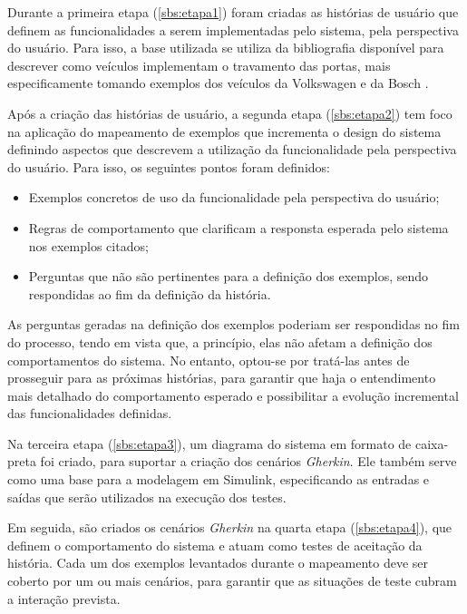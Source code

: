 Durante a primeira etapa (\ref{sbs:etapa1}) foram criadas as histórias de usuário que definem as funcionalidades a serem implementadas pelo sistema, 
pela perspectiva do usuário. Para isso, a base utilizada se utiliza da bibliografia disponível para descrever como veículos implementam o travamento das portas, 
mais especificamente tomando exemplos dos veículos da Volkswagen \cite{vwLocking} e da Bosch \cite{bosch2022handbook,reif2017locking}.

Após a criação das histórias de usuário, a segunda etapa (\ref{sbs:etapa2}) tem foco na aplicação do mapeamento de exemplos que incrementa o design do sistema definindo aspectos 
que descrevem a utilização da funcionalidade pela perspectiva do usuário. Para isso, os seguintes pontos foram definidos:

\begin{itemize}
    \item Exemplos concretos de uso da funcionalidade pela perspectiva do usuário;
    \item Regras de comportamento que clarificam a responsta esperada pelo sistema nos exemplos citados;
    \item Perguntas que não são pertinentes para a definição dos exemplos, sendo respondidas ao fim da definição da história.
\end{itemize}

As perguntas geradas na definição dos exemplos poderiam ser respondidas no fim do processo, tendo em vista que, a princípio, elas não afetam a definição 
dos comportamentos do sistema. No entanto, optou-se por tratá-las antes de prosseguir para as próximas histórias, para garantir que haja o entendimento 
mais detalhado do comportamento esperado e possibilitar a evolução incremental das funcionalidades definidas.

Na terceira etapa (\ref{sbs:etapa3}), um diagrama do sistema em formato de caixa-preta foi criado, para suportar a criação dos cenários \textit{Gherkin}. Ele 
também serve como uma base para a modelagem em Simulink, especificando as entradas e saídas que serão utilizados na execução dos testes.

Em seguida, são criados os cenários \textit{Gherkin} na quarta etapa (\ref{sbs:etapa4}), que definem o comportamento do sistema e atuam como testes de aceitação 
da história. Cada um dos exemplos levantados durante o mapeamento deve ser coberto por um ou mais cenários, para garantir que as situações de teste cubram 
a interação prevista.



